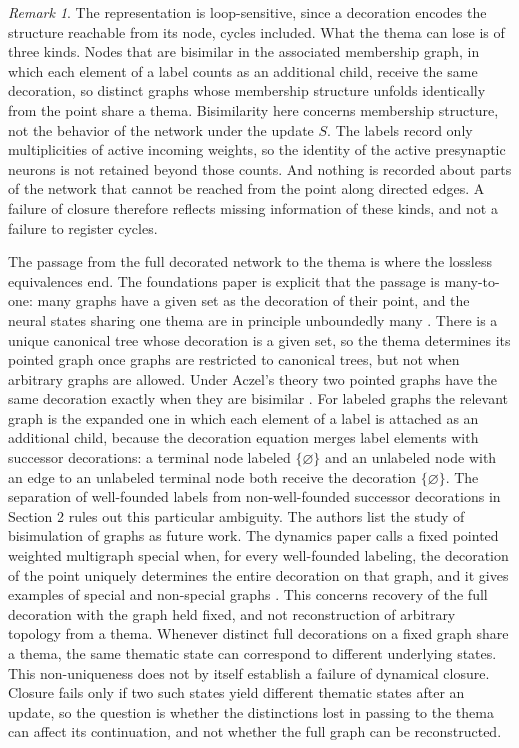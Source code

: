 \documentclass[11pt, a4paper]{article}
\theoremstyle{plain}
\theoremstyle{definition}
\theoremstyle{remark}
\newtheorem{remark}[theorem]{Remark}
\begin{document}
\begin{remark}
The representation is loop-sensitive, since a decoration encodes the structure reachable from its node, cycles included. What the thema can lose is of three kinds. Nodes that are bisimilar in the associated membership graph, in which each element of a label counts as an additional child, receive the same decoration, so distinct graphs whose membership structure unfolds identically from the point share a thema. Bisimilarity here concerns membership structure, not the behavior of the network under the update $S$. The labels record only multiplicities of active incoming weights, so the identity of the active presynaptic neurons is not retained beyond those counts. And nothing is recorded about parts of the network that cannot be reached from the point along directed edges. A failure of closure therefore reflects missing information of these kinds, and not a failure to register cycles.
\end{remark}

The passage from the full decorated network to the thema is where the lossless equivalences end. The foundations paper is explicit that the passage is many-to-one: many graphs have a given set as the decoration of their point, and the neural states sharing one thema are in principle unboundedly many \cite{mz2009}. There is a unique canonical tree whose decoration is a given set, so the thema determines its pointed graph once graphs are restricted to canonical trees, but not when arbitrary graphs are allowed. Under Aczel's theory two pointed graphs have the same decoration exactly when they are bisimilar \cite{aczel1988}. For labeled graphs the relevant graph is the expanded one in which each element of a label is attached as an additional child, because the decoration equation merges label elements with successor decorations: a terminal node labeled $\{\varnothing\}$ and an unlabeled node with an edge to an unlabeled terminal node both receive the decoration $\{\varnothing\}$. The separation of well-founded labels from non-well-founded successor decorations in Section 2 rules out this particular ambiguity. The authors list the study of bisimulation of graphs as future work. The dynamics paper calls a fixed pointed weighted multigraph special when, for every well-founded labeling, the decoration of the point uniquely determines the entire decoration on that graph, and it gives examples of special and non-special graphs \cite[Definition 5.3 and Section 5.2]{mz2010}. This concerns recovery of the full decoration with the graph held fixed, and not reconstruction of arbitrary topology from a thema.
Whenever distinct full decorations on a fixed graph share a thema, the same thematic state can correspond to different underlying states. This non-uniqueness does not by itself establish a failure of dynamical closure. Closure fails only if two such states yield different thematic states after an update, so the question is whether the distinctions lost in passing to the thema can affect its continuation, and not whether the full graph can be reconstructed.
\end{document}
